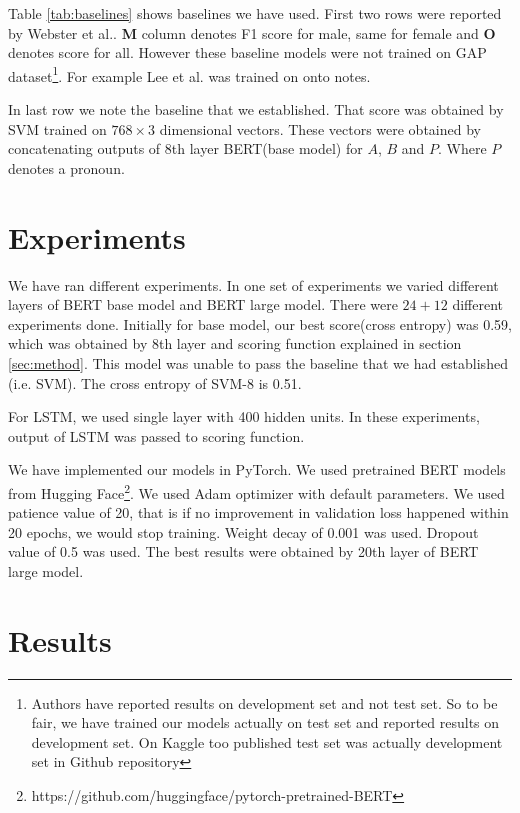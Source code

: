 \documentclass[11pt,a4paper]{article}
\begin{document}
Table \ref{tab:baselines} shows baselines we have used. First two rows were reported by Webster et al.. \textbf{M} column denotes F1 score for male, same for female and \textbf{O} denotes score for all. However these baseline models were not trained on GAP dataset\footnote{Authors have reported results on development set and not test set. So to be fair, we have trained our models actually on test set and reported results on development set. On Kaggle too published test set was actually development set in Github repository}. For example Lee et al.  was trained on onto notes. 

In last row we note the baseline that we established. That score was obtained by SVM trained on $768 \times 3$ dimensional vectors. These vectors were obtained by concatenating outputs of 8th layer BERT(base model) for $A$, $B$ and $P$. Where $P$ denotes a pronoun.  

\section{Experiments}
\label{sec:experiments}

We have ran different experiments. In one set of experiments we varied different layers of BERT base model and BERT large model. There were $24 + 12$ different experiments done. Initially for base model, our best score(cross entropy) was 0.59, which was obtained by 8th layer and scoring function explained in section \ref{sec:method}. This model was unable to pass the baseline that we had established (i.e. SVM). The cross entropy of SVM-8 is 0.51.



For LSTM, we used single layer with 400 hidden units. In these experiments, output of LSTM was passed to scoring function.

We have implemented our models in PyTorch. We used pretrained BERT models from Hugging Face\footnote{https://github.com/huggingface/pytorch-pretrained-BERT}. We used Adam optimizer with default parameters. We used patience value of 20, that is if no improvement in validation loss happened within 20 epochs, we would stop training. Weight decay of 0.001 was used. Dropout value of 0.5 was used. The best results were obtained by 20th layer of BERT large model.

\section{Results}
\label{sec:results}
\end{document}
